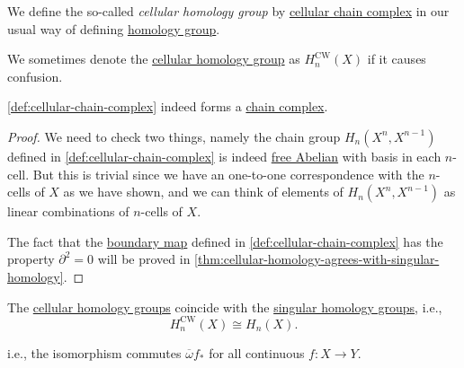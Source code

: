 \begin{definition}\label{def:cellular-homology-group}
	We define the so-called \emph{cellular homology group} by \hyperref[def:cellular-chain-complex]{cellular chain complex} in our usual way of defining
	\hyperref[def:homology-group]{homology group}.
\end{definition}
\begin{remark}
	We sometimes denote the \hyperref[def:cellular-homology-group]{cellular homology group} as \(H_n^{\mathrm{CW} }(X) \) if it causes confusion.
\end{remark}
\begin{theorem}\label{thm:lec-32}
	\autoref{def:cellular-chain-complex} indeed forms a \hyperref[def:chain-complex]{chain complex}.
\end{theorem}
\begin{proof}
	We need to check two things, namely the chain group \(H_n(X^n, X^{n-1} )\) defined in \autoref{def:cellular-chain-complex}
	is indeed \hyperref[def:free-Abelian-group]{free Abelian} with basis in each \(n\)-cell. But this is trivial since we have
	an one-to-one correspondence with the \(n\)-cells of \(X\) as we have shown, and we can think of elements of \(H_n(X^n, X^{n-1} )\)
	as linear combinations of \(n\)-cells of \(X\).

	The fact that the \hyperref[def:boundary-homomorphism]{boundary map} defined in \autoref{def:cellular-chain-complex} has the property \(\partial ^{2} = 0\)
	will be proved in \autoref{thm:cellular-homology-agrees-with-singular-homology}.
\end{proof}
\begin{theorem}\label{thm:cellular-homology-agrees-with-singular-homology}
	The \hyperref[def:cellular-homology-group]{cellular homology groups} coincide with the \hyperref[def:singular-homology-group]{singular homology groups}, i.e.,
	\[
		H_n^{\mathrm{CW} }(X) \cong H_n(X).
	\]
\end{theorem}
\begin{note}
	i.e., the isomorphism commutes \(\overline{\omega} f_\ast\) for all continuous \(f\colon X\to Y\).
\end{note}

